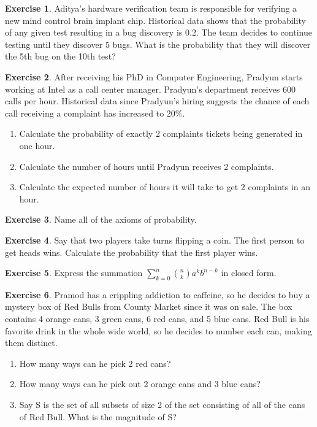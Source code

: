 \documentclass[12pt]{amsart}
\theoremstyle{definition}
\newtheorem{exercise}{Exercise}
\numberwithin{equation}{section}
\theoremstyle{plain}
\begin{document}
\begin{exercise}
    Aditya's hardware verification team is responsible for verifying a new mind control brain implant chip. Historical data shows that the probability of any given test resulting in a bug discovery is 0.2. The team decides to continue testing until they discover 5 bugs. What is the probability that they will discover the 5th bug on the 10th test?%
\end{exercise}

\begin{exercise}
    After receiving his PhD in Computer Engineering, Pradyun starts working at Intel as a call center manager. Pradyun's department receives 600 calls per hour. Historical data since Pradyun's hiring suggests the chance of each call receiving a complaint has increased to 20\%. 
    \begin{enumerate}
    \item Calculate the probability of exactly 2 complaints tickets being generated in one hour. 
    \item Calculate the number of hours until Pradyun receives 2 complaints.
    \item Calculate the expected number of hours it will take to get 2 complaints in an hour.
    \end{enumerate}
\end{exercise}

\begin{exercise}
Name all of the axioms of probability.
\end{exercise}

\begin{exercise}
Say that two players take turns flipping a coin. The first person to get heads wins. Calculate the probability that the first player wins.
\end{exercise}

\begin{exercise}
Express the summation $\sum_{k=0}^{n}\binom{n}{k}a^kb^{n-k}$ in closed form.
\end{exercise}

\begin{exercise}
Pramod has a crippling addiction to caffeine, so he decides to buy a mystery box of Red Bulls from County Market since it was on sale. The box contains 4 orange cans, 3 green cans, 6 red cans, and 5 blue cans. Red Bull is his favorite drink in the whole wide world, so he decides to number each can, making them distinct. 
\begin{enumerate}
\item How many ways can he pick 2 red cans?
\item How many ways can he pick out 2 orange cans and 3 blue cans?
\item Say S is the set of all subsets of size 2 of the set consisting of all of the cans of Red Bull. What is the magnitude of S?
\end{enumerate}
\end{exercise}
\end{document}
